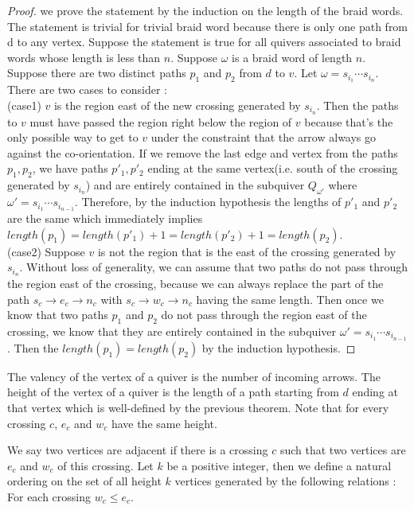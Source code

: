 \begin{proof}
we prove the statement by the induction on the length of the braid words. The statement is trivial for trivial braid word because there is only one path from d to any vertex. Suppose the statement is true for all quivers associated to braid words whose length is less than $n$. Suppose $\omega$ is a braid word of length $n$. Suppose there are two distinct paths $p_1$ and $p_2$ from $d$ to $v$. Let $\omega = s_{i_1}\cdots s_{i_n}$. There are two cases to consider :\\
(case1) $v$ is the region east of the new crossing generated by $s_{i_n}$. Then the paths to $v$ must have passed the region right below the region of $v$ because that's the only possible way to get to $v$ under the constraint that the arrow always go against the co-orientation. If we remove the last edge and vertex from the paths $p_1,p_2$, we have paths $p'_1,p'_2$ ending at the same vertex(i.e. south of the crossing generated by $s_{i_n}$) and are entirely contained in the subquiver $Q_{\omega '}$ where $\omega ' = s_{i_1}\cdots s_{i_{n-1}}$. Therefore, by the induction hypothesis the lengths of $p'_1$ and $p'_2$ are the same which immediately implies $length(p_1) = length(p'_1) + 1 =length(p'_2) + 1 = length(p_2)$.\\
(case2) Suppose $v$ is not the region that is the east of the crossing generated by $s_{i_n}$. Without loss of generality, we can assume that two paths do not pass through the region east of the crossing, because we can always replace the part of the path $s_c\rightarrow e_c \rightarrow n_c$ with $s_c\rightarrow w_c \rightarrow n_c$ having the same length. Then once we know that two paths $p_1$ and $p_2$ do not pass through the region east of the crossing, we know that they are entirely contained in the subquiver $\omega ' = s_{i_1}\cdots s_{i_{n-1}}$. Then the $length(p_1) = length(p_2)$ by the induction hypothesis.
\end{proof}


\begin{definition}
 The valency of the vertex of a quiver is the number of incoming arrows. The height of the vertex of a quiver is the length of a path starting from $d$ ending at that vertex which is well-defined by the previous theorem. Note that for every crossing $c$, $e_c$ and $w_c$ have the same height. 
\end{definition}

\begin{definition}
 We say two vertices are adjacent if there is a crossing $c$ such that two vertices are $e_c$ and $w_c$ of this crossing. Let $k$ be a positive integer, then we define a natural ordering on the set of all height $k$ vertices generated by the following relations : For each crossing $w_c \leq e_c $.
 
\end{definition}

